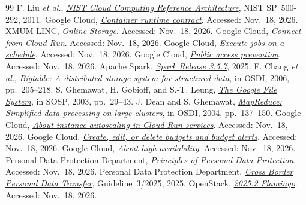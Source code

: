 \begin{thebibliography}{99}
\setlength{\itemsep}{1.5pt}\small
{}
F. Liu \emph{et al.}, \href{https://www.nist.gov/publications/nist-cloud-computing-reference-architecture}{\emph{NIST Cloud Computing Reference Architecture}}, NIST SP~500-292, 2011.
Google Cloud, \href{https://docs.cloud.google.com/run/docs/container-contract}{\emph{Container runtime contract}}. Accessed: Nov.~18, 2026.
XMUM LINC, \href{https://linc.xmu.edu.my/online-storage/}{\emph{Online Storage}}. Accessed: Nov.~18, 2026.
Google Cloud, \href{https://docs.cloud.google.com/sql/docs/postgres/connect-run}{\emph{Connect from Cloud Run}}. Accessed: Nov.~18, 2026.
Google Cloud, \href{https://docs.cloud.google.com/run/docs/execute/jobs-on-schedule}{\emph{Execute jobs on a schedule}}. Accessed: Nov.~18, 2026.
Google Cloud, \href{https://docs.cloud.google.com/storage/docs/public-access-prevention}{\emph{Public access prevention}}. Accessed: Nov.~18, 2026.
Apache Spark, \href{https://spark.apache.org/releases/spark-release-3-5-7.html}{\emph{Spark Release 3.5.7}}, 2025.
F. Chang \emph{et al.}, \href{https://research.google/pubs/bigtable-a-distributed-storage-system-for-structured-data/}{\emph{Bigtable: A distributed storage system for structured data}}, in OSDI, 2006, pp.~205--218.
S. Ghemawat, H. Gobioff, and S.-T. Leung, \href{https://research.google/pubs/the-google-file-system/}{\emph{The Google File System}}, in SOSP, 2003, pp.~29--43.
J. Dean and S. Ghemawat, \href{https://research.google/pubs/mapreduce-simplified-data-processing-on-large-clusters/}{\emph{MapReduce: Simplified data processing on large clusters}}, in OSDI, 2004, pp.~137--150.
Google Cloud, \href{https://docs.cloud.google.com/run/docs/about-instance-autoscaling}{\emph{About instance autoscaling in Cloud Run services}}. Accessed: Nov.~18, 2026.
Google Cloud, \href{https://docs.cloud.google.com/billing/docs/how-to/budgets}{\emph{Create, edit, or delete budgets and budget alerts}}. Accessed: Nov.~18, 2026.
Google Cloud, \href{https://docs.cloud.google.com/sql/docs/postgres/high-availability}{\emph{About high availability}}. Accessed: Nov.~18, 2026.
Personal Data Protection Department, \href{https://www.pdp.gov.my/en/principles-of-personal-data-protection/}{\emph{Principles of Personal Data Protection}}. Accessed: Nov.~18, 2026.
Personal Data Protection Department, \href{https://www.pdp.gov.my/ppdpv1/wp-content/uploads/2025/08/GP_CBPDT_EN.pdf}{\emph{Cross Border Personal Data Transfer}}, Guideline~3/2025, 2025.
OpenStack, \href{https://releases.openstack.org/flamingo/}{\emph{2025.2 Flamingo}}. Accessed: Nov.~18, 2026.
\end{thebibliography}

